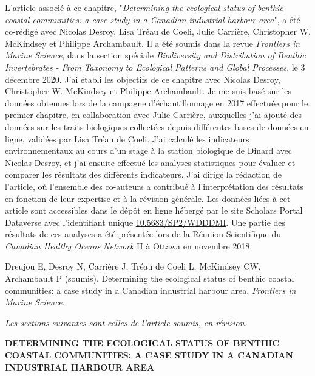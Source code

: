 L'article associé à ce chapitre, "\textit{Determining the ecological status of benthic coastal communities: a case study in a Canadian industrial harbour area}", a été co-rédigé avec Nicolas Desroy, Lisa Tréau de Coeli, Julie Carrière, Christopher W. McKindsey et Philippe Archambault. Il a été soumis dans la revue \textit{Frontiers in Marine Science}, dans la section spéciale \textit{Biodiversity and Distribution of Benthic Invertebrates - From Taxonomy to Ecological Patterns and Global Processes}, le 3 décembre 2020. J'ai établi les objectifs de ce chapitre avec Nicolas Desroy, Christopher W. McKindsey et Philippe Archambault. Je me suis basé sur les données obtenues lors de la campagne d'échantillonnage en 2017 effectuée pour le premier chapitre, en collaboration avec Julie Carrière, auxquelles j'ai ajouté des données sur les traits biologiques collectées depuis différentes bases de données en ligne, validées par Lisa Tréau de Coeli. J'ai calculé les indicateurs environnementaux au cours d'un stage à la station biologique de Dinard avec Nicolas Desroy, et j'ai ensuite effectué les analyses statistiques pour évaluer et comparer les résultats des différents indicateurs. J'ai dirigé la rédaction de l'article, où l'ensemble des co-auteurs a contribué à l'interprétation des résultats en fonction de leur expertise et à la révision générale. Les données liées à cet article sont accessibles dans le dépôt en ligne hébergé par le site Scholars Portal Dataverse avec l'identifiant unique \href{https://doi.org/10.5683/SP2/WDDDMI}{10.5683/SP2/WDDDMI}. Une partie des résultats de ces analyses a été présentée lors de la Réunion Scientifique du \textit{Canadian Healthy Oceans Network} II à Ottawa en novembre 2018. \linebreak[4]

\begin{singlespace}
Dreujou E, Desroy N, Carrière J, Tréau de Coeli L, McKindsey CW, Archambault P (soumis). Determining the ecological status of benthic coastal communities: a case study in a Canadian industrial harbour area. \textit{Frontiers in Marine Science}.
\end{singlespace}

\textit{Les sections suivantes sont celles de l'article soumis, en révision.}

\clearpage

\begin{center}
\textbf{DETERMINING THE ECOLOGICAL STATUS OF BENTHIC COASTAL COMMUNITIES: A CASE STUDY IN A CANADIAN INDUSTRIAL HARBOUR AREA}
\end{center}
